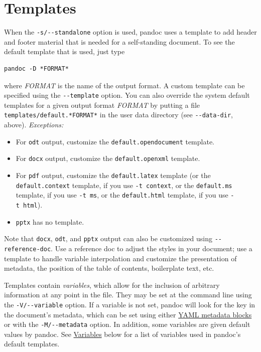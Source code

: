 \documentclass[
]{article}
\providecommand{\tightlist}{%
  \setlength{\itemsep}{0pt}\setlength{\parskip}{0pt}}
\begin{document}
\hypertarget{templates}{%
\section{Templates}\label{templates}}

When the \texttt{-s/-\/-standalone} option is used, pandoc uses a
template to add header and footer material that is needed for a
self-standing document. To see the default template that is used, just
type

\begin{verbatim}
pandoc -D *FORMAT*
\end{verbatim}

where \emph{FORMAT} is the name of the output format. A custom template
can be specified using the \texttt{-\/-template} option. You can also
override the system default templates for a given output format
\emph{FORMAT} by putting a file \texttt{templates/default.*FORMAT*} in
the user data directory (see \texttt{-\/-data-dir}, above).
\emph{Exceptions:}

\begin{itemize}
\tightlist
\item
  For \texttt{odt} output, customize the \texttt{default.opendocument}
  template.
\item
  For \texttt{docx} output, customize the \texttt{default.openxml}
  template.
\item
  For \texttt{pdf} output, customize the \texttt{default.latex} template
  (or the \texttt{default.context} template, if you use
  \texttt{-t\ context}, or the \texttt{default.ms} template, if you use
  \texttt{-t\ ms}, or the \texttt{default.html} template, if you use
  \texttt{-t\ html}).
\item
  \texttt{pptx} has no template.
\end{itemize}

Note that \texttt{docx}, \texttt{odt}, and \texttt{pptx} output can also
be customized using \texttt{-\/-reference-doc}. Use a reference doc to
adjust the styles in your document; use a template to handle variable
interpolation and customize the presentation of metadata, the position
of the table of contents, boilerplate text, etc.

Templates contain \emph{variables}, which allow for the inclusion of
arbitrary information at any point in the file. They may be set at the
command line using the \texttt{-V/-\/-variable} option. If a variable is
not set, pandoc will look for the key in the document's metadata, which
can be set using either
\protect\hyperlink{extension-yaml_metadata_block}{YAML metadata blocks}
or with the \texttt{-M/-\/-metadata} option. In addition, some variables
are given default values by pandoc. See
\protect\hyperlink{variables}{Variables} below for a list of variables
used in pandoc's default templates.
\end{document}
